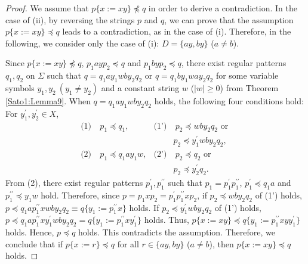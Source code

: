 \begin{proof}
We assume that $p \{ x := xy \} \not \preceq q$ in order to derive a contradiction.
In the case of \textrm{(ii)}, by reversing the strings $p$ and $q$, we can prove that the assumption $p \{ x := xy \} \preceq q$ leads to a contradiction, as in the case of \textrm{(i)}.
Therefore, in the following, we consider only the case of \textrm{(i)}: $D=\{ ay, by \}$ ($a \not= b$).

Since $p \{ x := xy \} \not \preceq q$, $p_{1}ayp_{2}\preceq q$ and $p_{1}byp_{2}\preceq q$, 
there exist regular patterns $q_{1},q_{2}$ on $\Sigma$ such that $q=q_{1}ay_{1}wby_{2}q_{2}$ or $q=q_{1}by_{1}way_{2}q_{2}$ for some variable symbols $y_{1},y_{2}~(y_{1} \not= y_{2})$ and a constant string $w$ ($|w|\geq 0$) from Theorem \ref{Sato1:Lemma9}.
When $q=q_{1}ay_{1}wby_{2}q_{2}$ holds, the following four conditions hold: For $y_{1}^{\prime}, y_{2}^{\prime}\in X$,
\begin{align*}
\textrm{(1)} & ~p_{1} \preceq q_{1}, & \textrm{(1')} & ~p_{2} \preceq wby_{2}q_{2} \mbox{ or }\\
& & & p_{2} \preceq y_{1}^{\prime}wby_{2}q_{2},\\
\textrm{(2)} & ~p_{1} \preceq q_{1}ay_{1}w, & \textrm{(2')} & ~p_{2} \preceq q_{2} \mbox{ or }\\
& & & p_{2} \preceq y_{2}^{\prime}q_{2}.
\end{align*}
From (2), there exist regular patterns $p_{1}^{\prime},p_{1}^{\prime\prime}$ such that $p_{1}=p_{1}^{\prime}p_{1}^{\prime\prime}$, $p_{1}^{\prime} \preceq q_{1}a$ and $p_{1}^{\prime\prime} \preceq y_{1}w$ hold.
Therefore, since $p=p_{1}xp_{2}=p_{1}^{\prime}p_{1}^{\prime\prime}xp_{2}$,
if $p_{2} \preceq wby_{2}q_{2}$ of (1') holds, 
$p\preceq q_{1}ap_{1}^{\prime\prime}xwby_{2}q_{2}\equiv q \{ y_{1} := p_{1}^{\prime\prime}x \}$ holds.
If $p_2\preceq y_{1}^{\prime}wby_{2}q_{2}$ of (1') holds, $p\preceq q_{1}ap_{1}^{\prime\prime}xy_{1}^{\prime}wby_{2}q_{2}=q \{ y_{1} := p_{1}^{\prime\prime}xy_{1}^{\prime} \}$ holds.
Thus, $p\{x := xy\} \preceq q \{ y_{1} := p_{1}^{\prime\prime}xyy_{1}^{\prime} \}$ holds.
Hence, $p \preceq q$ holds.
This contradicts the assumption.
Therefore, we conclude that if $p \{ x := r \} \preceq q$ for all $r \in \{ ay, by \}$ ($a \not= b$), then $p \{ x := xy \} \preceq q$ holds.
\end{proof}

